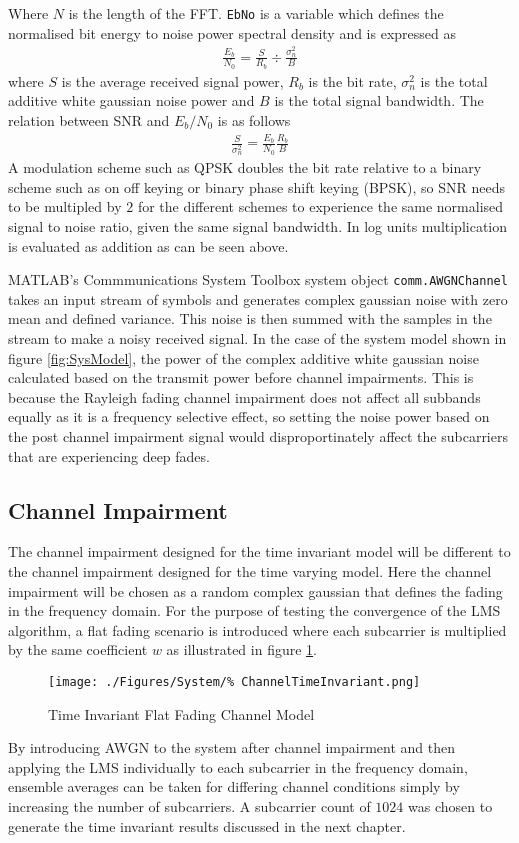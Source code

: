 Where $N$ is the length of the FFT. \texttt{EbNo} is a %
variable which defines the normalised bit energy %
to noise power spectral density and is %
expressed as
\begin{align}
	\frac{E_b}{N_0} = \frac{S}{R_b} \div 
	\frac{\sigma_n^{2}}{B}
\end{align}
where $S$ is the average received signal power, %
$R_b$ is the bit rate, $\sigma_n^{2}$ is the %
total additive white gaussian noise power and %
$B$ is the total signal bandwidth. The relation %
between SNR and $E_b/N_0$ is as follows
\begin{align}
	\frac{S}{\sigma_n^{2}} = \frac{E_b}{N_0}
	\frac{R_b}{B}
\end{align}
A modulation scheme such as QPSK doubles the bit %
rate relative to a binary scheme such as on off %
keying or binary phase shift keying (BPSK), so %
SNR needs to be multipled by $2$ for the different %
schemes to experience the same normalised %
signal to noise ratio, given the same signal bandwidth. %
In log units multiplication %
is evaluated as addition as can be seen above.

MATLAB's Commmunications System Toolbox system object %
\texttt{comm.AWGNChannel} takes an input stream of %
symbols and generates complex gaussian noise with %
zero mean and defined variance. This noise is then %
summed with the samples in the stream to make a noisy %
received signal. In the case of the system model shown in %
figure \ref{fig:SysModel}, the power of the complex %
additive white gaussian noise calculated based on the transmit %
power before channel impairments. This is because the Rayleigh %
fading channel impairment does not affect all subbands equally as %
it is a frequency selective effect, so setting the noise power based %
on the post channel impairment signal would disproportinately affect %
the subcarriers that are experiencing deep fades.

\subsection{Channel Impairment}
\label{sec:TIChannelImpairment}
The channel impairment designed for the time invariant model %
will be different to the channel impairment designed for the time varying model. %
Here the channel impairment will be chosen as a random complex gaussian that %
defines the fading in the frequency domain. For the purpose of testing the convergence %
of the LMS algorithm, a flat fading scenario is introduced where each subcarrier %
is multiplied by the same coefficient $w$ as illustrated in figure \ref{fig:TIChannel}.
\begin{figure}[ht]
	\texttt{[image: ./Figures/System/\%
	ChannelTimeInvariant.png]}
	\caption{Time Invariant Flat Fading Channel Model}
	\label{fig:TIChannel}
\end{figure}
By introducing AWGN to the system after channel impairment and then %
applying the LMS individually to each subcarrier in the frequency domain, %
ensemble averages can be taken for differing channel conditions simply by %
increasing the number of subcarriers. A subcarrier count of $1024$ was %
chosen to generate the time invariant results discussed in the next chapter. %

